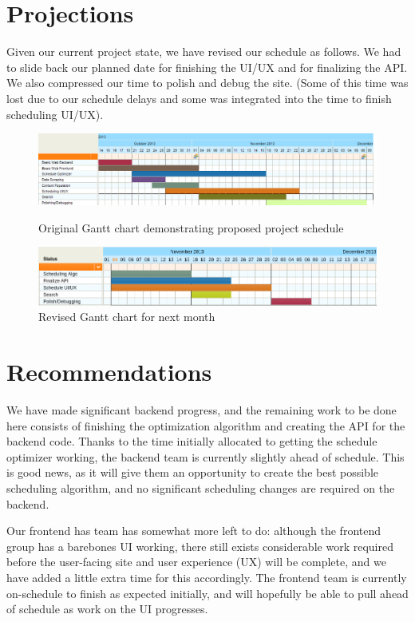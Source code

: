 \section{Projections}
Given our current project state, we have revised our schedule as follows.
We had to slide back our planned date for finishing the UI/UX and for finalizing
the API. We also compressed our time to polish and debug the site. (Some of this
time was lost due to our schedule delays and some was integrated into the time to
finish scheduling UI/UX).
\begin{figure}[H]
  \centering
  \includegraphics[width=\textwidth]{gantt.png}
  \caption{Original Gantt chart demonstrating proposed project schedule}
  \includegraphics[width=\textwidth]{revised-gantt.png}
  \caption{Revised Gantt chart for next month}
\end{figure}

\section{Recommendations}

We have made significant backend progress, and the remaining work to be done
here consists of finishing the optimization algorithm and
creating the API for the backend code. Thanks to the time initially
allocated to getting the schedule optimizer working, the backend team is
currently slightly ahead of schedule. This is good news, as it will
give them an opportunity to create the best possible scheduling algorithm,
and no significant scheduling changes are required on the backend.

Our frontend has team has somewhat more left to do: although the frontend group
has a barebones UI working, there still exists considerable work required
before the user-facing site and user experience (UX) will be complete, and 
we have added a little extra time for this accordingly.
The frontend team is currently on-schedule to finish as expected initially,
and will hopefully be able to pull ahead of schedule as work on the UI
progresses.


